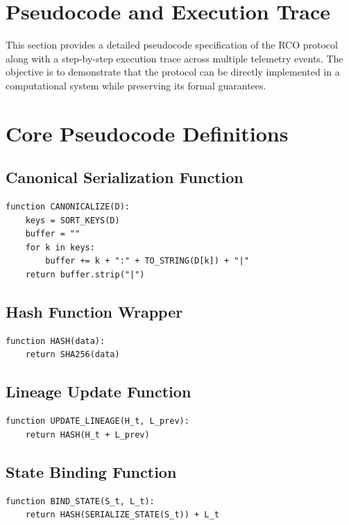 \section{Pseudocode and Execution Trace}

This section provides a detailed pseudocode specification of the RCO protocol along with a step-by-step execution trace across multiple telemetry events. The objective is to demonstrate that the protocol can be directly implemented in a computational system while preserving its formal guarantees.

\section{Core Pseudocode Definitions}

\subsection{Canonical Serialization Function}

\begin{verbatim}
function CANONICALIZE(D):
    keys = SORT_KEYS(D)
    buffer = ""
    for k in keys:
        buffer += k + ":" + TO_STRING(D[k]) + "|"
    return buffer.strip("|")
\end{verbatim}

\subsection{Hash Function Wrapper}

\begin{verbatim}
function HASH(data):
    return SHA256(data)
\end{verbatim}

\subsection{Lineage Update Function}

\begin{verbatim}
function UPDATE_LINEAGE(H_t, L_prev):
    return HASH(H_t + L_prev)
\end{verbatim}

\subsection{State Binding Function}

\begin{verbatim}
function BIND_STATE(S_t, L_t):
    return HASH(SERIALIZE_STATE(S_t)) + L_t
\end{verbatim}

